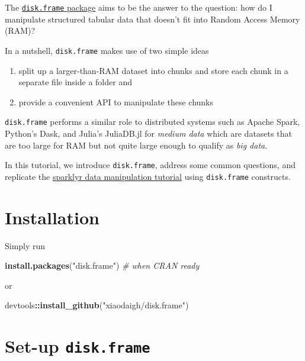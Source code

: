\documentclass[]{book}
\newenvironment{Shaded}{\begin{snugshade}}{\end{snugshade}}
\newcommand{\CommentTok}[1]{\textcolor[rgb]{0.56,0.35,0.01}{\textit{#1}}}
\newcommand{\KeywordTok}[1]{\textcolor[rgb]{0.13,0.29,0.53}{\textbf{#1}}}
\newcommand{\NormalTok}[1]{#1}
\newcommand{\OperatorTok}[1]{\textcolor[rgb]{0.81,0.36,0.00}{\textbf{#1}}}
\newcommand{\StringTok}[1]{\textcolor[rgb]{0.31,0.60,0.02}{#1}}
\providecommand{\tightlist}{%
  \setlength{\itemsep}{0pt}\setlength{\parskip}{0pt}}
\begin{document}
The \href{https://github.com/xiaodaigh/disk.frame}{\texttt{disk.frame} package} aims to be the answer to the question: how do I manipulate structured tabular data that doesn't fit into Random Access Memory (RAM)?

In a nutshell, \texttt{disk.frame} makes use of two simple ideas

\begin{enumerate}
\def\labelenumi{\arabic{enumi})}
\tightlist
\item
  split up a larger-than-RAM dataset into chunks and store each chunk in a separate file inside a folder and
\item
  provide a convenient API to manipulate these chunks
\end{enumerate}

\texttt{disk.frame} performs a similar role to distributed systems such as Apache Spark, Python's Dask, and Julia's JuliaDB.jl for \emph{medium data} which are datasets that are too large for RAM but not quite large enough to qualify as \emph{big data}.

In this tutorial, we introduce \texttt{disk.frame}, address some common questions, and replicate the \href{https://spark.rstudio.com/dplyr/}{sparklyr data manipulation tutorial} using \texttt{disk.frame} constructs.

\hypertarget{installation}{%
\section{Installation}\label{installation}}

Simply run

\begin{Shaded}
\begin{Highlighting}[]
\KeywordTok{install.packages}\NormalTok{(}\StringTok{"disk.frame"}\NormalTok{) }\CommentTok{# when CRAN ready}
\end{Highlighting}
\end{Shaded}

or

\begin{Shaded}
\begin{Highlighting}[]
\NormalTok{devtools}\OperatorTok{::}\KeywordTok{install_github}\NormalTok{(}\StringTok{"xiaodaigh/disk.frame"}\NormalTok{)}
\end{Highlighting}
\end{Shaded}

\hypertarget{set-up-disk.frame}{%
\section{\texorpdfstring{Set-up \texttt{disk.frame}}{Set-up disk.frame}}\label{set-up-disk.frame}}
\end{document}

